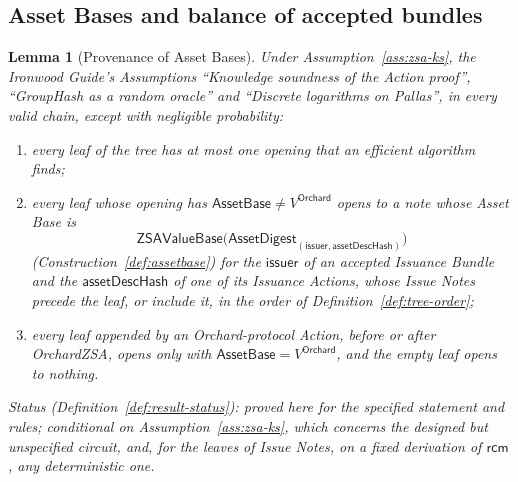 \documentclass[11pt,a4paper]{article}
\newtheorem{lemma}[theorem]{Lemma}
\theoremstyle{definition}
\newcommand{\rcm}{\ensuremath{\mathsf{rcm}}}
\begin{document}
\FloatBarrier
\subsection{Asset Bases and balance of accepted bundles}
\label{sec:security-counterfeit}

\begin{lemma}[Provenance of Asset Bases]\label{lem:provenance}
Under Assumption~\ref{ass:zsa-ks}, the \emph{Ironwood Guide}'s Assumptions
``Knowledge soundness of the Action proof'', ``GroupHash as a random
oracle'' and ``Discrete logarithms on Pallas'', in every valid chain, except
with negligible probability:
\begin{enumerate}
\item[(i)] every leaf of the tree has at most one opening that an efficient
  algorithm finds;
\item[(ii)] every leaf whose opening has $\mathsf{AssetBase} \neq
  V^{\mathsf{Orchard}}$ opens to a note whose Asset Base is
  \[
    \mathsf{ZSAValueBase}\bigl(
    \mathsf{AssetDigest}_{(\mathsf{issuer}, \mathsf{assetDescHash})}\bigr)
  \]
  (Construction~\ref{def:assetbase}) for the $\mathsf{issuer}$ of an
  accepted Issuance Bundle and the $\mathsf{assetDescHash}$ of one of its
  Issuance Actions, whose Issue Notes precede the leaf, or include it, in
  the order of Definition~\ref{def:tree-order};
\item[(iii)] every leaf appended by an Orchard-protocol Action, before or
  after OrchardZSA, opens only with $\mathsf{AssetBase} =
  V^{\mathsf{Orchard}}$, and the empty leaf opens to nothing.
\end{enumerate}
Status (Definition~\ref{def:result-status}): proved here for the specified
statement and rules; conditional on Assumption~\ref{ass:zsa-ks}, which
concerns the designed but unspecified circuit, and, for the leaves of Issue
Notes, on a fixed derivation of $\rcm$, any deterministic one.
\end{lemma}
\end{document}
